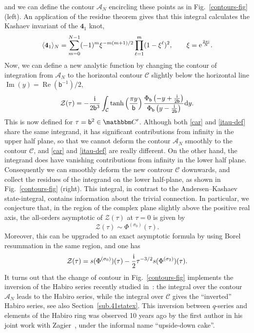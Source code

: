 \documentclass[12pt,reqno]{amsart}
\theoremstyle{definition}
\def\BC{\mathbbm C}
\def\calA{\mathcal A}
\def\be{\begin{equation}}
\def\ee{\end{equation}}
\def\bb{\mathsf{b}}
\def\ri{\mathrm{i}}
\def\rd{\mathrm{d}}
\def\re{{\rm e}}
\def\ri{{\rm i}}
\def\rd{{\rm d}}
\newcommand{\figref}[1]{Fig.~\protect\ref{#1}}
\def\mc{\mathcal}
\def\md{\mathbf}
\newcommand{\knot}[1]{\md{#1}}
\newcommand{\fad}{\operatorname{\Phi}_{\mathsf{b}}}
\newcommand{\mb}{{\mathsf{b}}}
\DeclareMathOperator{\real}{Re}
\DeclareMathOperator{\imag}{Im}
\begin{document}
%
and we can define the contour ${\mathcal A}_N$ encircling these points as
in \figref{contours-fig} (left). An application of the residue theorem
gives that this integral calculates the Kashaev invariant of the $\knot{4}_1$
knot,
%
\be
\label{kas-ex}
\langle \knot{4}_1 \rangle_N=\sum_{m=0}^{N-1} (-1)^m \xi^{-m(m+1)/2}
\prod_{\ell=1}^m (1- \xi^\ell)^2, \qquad \xi = \re^{2\pi \ri \over N}. 
\ee
%
Now, we can define a new analytic function by changing the contour of
integration from $\calA_N$ to the horizontal contour $\mathcal C$
slightly below the horizontal line $\imag(y) = \real(\bb^{-1})/2$,
%
\be
\label{itau-def}
{ \mc{Z}}(\tau)= -\frac{\ri}{2\bb^3}\int_{\mathcal C} 
\tanh\left( {\pi y \over \mb} \right) {\fad \left( -y +{\ri \over 2 \mb} \right)
  \over \fad \left(y -{\ri \over 2 \mb} \right)} \rd y.
\ee
%
This is now defined for $\tau= \mb^2 \in \BC'$. Although
both \eqref{car} and \eqref{itau-def} share the same integrand, it has
significant contributions from infinity in the upper half plane, so
that we cannot deform the contour $\mc{A}_N$ smoothly to the contour
$\mc{C}$, and \eqref{car} and \eqref{itau-def} are really different.
On the other hand, the integrand does have vanishing contributions
from infinity in the lower half plane. Consequently we can smoothly
deform the new controur $\mc{C}$ downwards, and collect the residues
of the integrand on the lower half-plane, as shown in
\figref{contours-fig} (right). This integral, in contrast to the
Andersen--Kashaev state-integral, contains information about the
trivial connection. In particular, we conjecture that, in the region
of the complex plane slightly above the positive real axis, the
all-orders asymptotic of $\mc{Z}(\tau)$ at $\tau=0$ is given by
%
\be
{ \mc{Z}}(\tau)\sim \Phi^{(\sigma_0)}(\tau). 
\ee
%
Moreover, this can be upgraded to an exact asymptotic formula by using Borel
resummation in the same region, and one has 
%
\be
\label{itau-borel}
{ \mc{Z}}(\tau)=  s( \Phi^{(\sigma_0)} )(\tau)
-{\ri \over 2}\tau^{-3/2}  s(\Phi^{(\sigma_2)} )(\tau) . 
\ee
%
It turns out that the change of contour in \figref{contours-fig} implements the
inversion of the Habiro series recently studied in~\cite{park-inverted}: the
integral over the contour ${\mathcal A}_N$ leads to the Habiro series, while the
integral over $\mathcal{C}$ gives the ``inverted'' Habiro series, see
also Section~\ref{sub.41statex}. This inversion between $q$-series and elements of
the Habiro ring was observed 10 years ago by the first author
in his joint work with  Zagier~\cite{GZ:qseries}, under the informal name
``upside-down cake''. %
\end{document}
